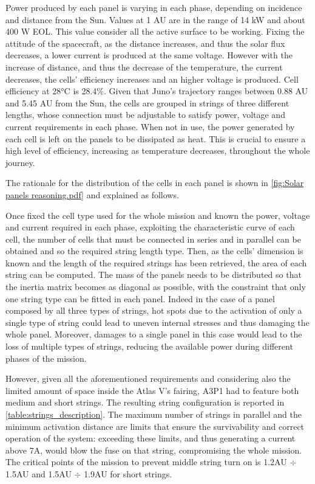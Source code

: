 Power produced by each panel is varying in each phase, depending on incidence and distance from the Sun. Values at 1 AU are in the range of 14 kW and about 400 W EOL. This value consider all the  active surface to be working. Fixing the attitude of the spacecraft, as the distance increases, and thus the solar flux decreases, a lower current is produced at the same voltage. However with the increase of distance, and thus the decrease of the temperature, the current decreases, the cells' efficiency increases and an higher voltage is produced. Cell efficiency at 28°C is 28.4\%.  Given that Juno's trajectory ranges between 0.88 AU and 5.45 AU from the Sun, the cells are grouped in strings of three different lengths, whose connection must be adjustable to satisfy power, voltage and current requirements in each phase. When not in use, the power generated by each cell is left on the panels to be dissipated as heat. This is crucial to ensure a high level of efficiency, increasing as temperature decreases, throughout the whole journey. 

The rationale for the distribution of the cells in each panel is shown in \autoref{fig:Solar panels reasoning.pdf} and explained as follows. 



 Once fixed the cell type used for the whole mission and known the power, voltage and current required in each phase, exploiting the characteristic curve of each cell, the number of cells that must be connected in series and in parallel can be obtained and so the required string length type. Then, as the cells' dimension is known and the length of the required strings has been retrieved, the area of each string can be computed. The mass of the panels needs to be distributed so that the inertia matrix becomes as diagonal as possible, with the constraint that only one string type can be fitted in each panel. Indeed in the case of a panel composed by all three types of strings, hot spots due to the activation of only a single type of string could lead to uneven internal stresses and thus damaging the whole panel. Moreover, damages to a single panel in this case would lead to the loss of multiple types of strings, reducing the available power during different phases of the mission. 
 
 However, given all the aforementioned requirements and considering also the limited amount of space inside the Atlas V's fairing, A3P1 had to feature both medium and short strings. The resulting string configuration is reported in \autoref{table:strings_description}. The maximum number of strings in parallel and the minimum activation distance are limits that ensure the survivability and correct operation of the system: exceeding these limits, and thus generating a current above 7A, would blow the fuse on that string, compromising the whole mission. The critical points of the mission to prevent middle string turn on is 1.2AU $\div$ 1.5AU and 1.5AU $\div$ 1.9AU for short strings.

